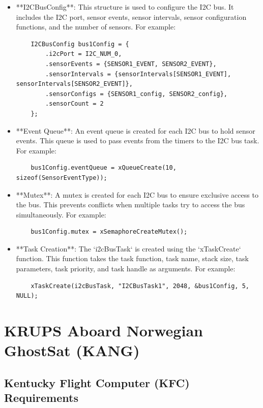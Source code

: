 \documentclass{book}
\begin{document}
\begin{itemize}
    \item **I2CBusConfig**: This structure is used to configure the I2C bus. It includes the I2C port, sensor events, sensor intervals, sensor configuration functions, and the number of sensors. For example:
    \begin{verbatim}
    I2CBusConfig bus1Config = {
        .i2cPort = I2C_NUM_0,
        .sensorEvents = {SENSOR1_EVENT, SENSOR2_EVENT},
        .sensorIntervals = {sensorIntervals[SENSOR1_EVENT], sensorIntervals[SENSOR2_EVENT]},
        .sensorConfigs = {SENSOR1_config, SENSOR2_config},
        .sensorCount = 2
    };
    \end{verbatim}
    \item **Event Queue**: An event queue is created for each I2C bus to hold sensor events. This queue is used to pass events from the timers to the I2C bus task. For example:
    \begin{verbatim}
    bus1Config.eventQueue = xQueueCreate(10, sizeof(SensorEventType));
    \end{verbatim}
    \item **Mutex**: A mutex is created for each I2C bus to ensure exclusive access to the bus. This prevents conflicts when multiple tasks try to access the bus simultaneously. For example:
    \begin{verbatim}
    bus1Config.mutex = xSemaphoreCreateMutex();
    \end{verbatim}
    \item **Task Creation**: The `i2cBusTask` is created using the `xTaskCreate` function. This function takes the task function, task name, stack size, task parameters, task priority, and task handle as arguments. For example:
    \begin{verbatim}
    xTaskCreate(i2cBusTask, "I2CBusTask1", 2048, &bus1Config, 5, NULL);
    \end{verbatim}
\end{itemize}

\chapter{KRUPS Aboard Norwegian GhostSat (KANG)}
\section{Kentucky Flight Computer (KFC) Requirements}
\end{document}
